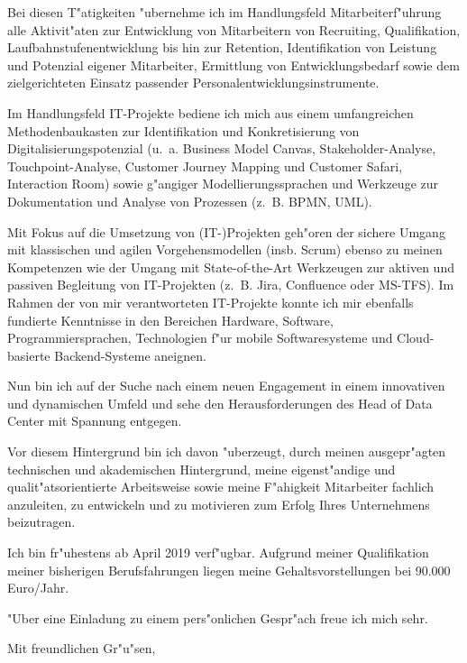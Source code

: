 \documentclass[11pt,a4paper]{dinbrief}
\begin{document}
\begin{letter}
Bei diesen T"atigkeiten "ubernehme ich im Handlungsfeld Mitarbeiterf"uhrung alle Aktivit"aten zur Entwicklung von Mitarbeitern von Recruiting, Qualifikation, Laufbahnstufenentwicklung bis hin zur Retention, Identifikation von Leistung und Potenzial eigener Mitarbeiter, Ermittlung von Entwicklungsbedarf sowie dem zielgerichteten Einsatz passender Personalentwicklungsinstrumente.

Im Handlungsfeld IT-Projekte bediene ich mich aus einem umfangreichen Methodenbaukasten zur Identifikation und Konkretisierung von Digitalisierungspotenzial (u.~a. Business Model Canvas, Stakeholder-Analyse, Touchpoint-Analyse, Customer Journey Mapping und Customer Safari, Interaction Room) sowie g"angiger Modellierungssprachen und Werkzeuge zur Dokumentation und Analyse von Prozessen (z.~B. BPMN, UML).

Mit Fokus auf die Umsetzung von (IT-)Projekten geh"oren der sichere Umgang mit klassischen und agilen Vorgehensmodellen (insb. Scrum) ebenso zu meinen Kompetenzen wie der Umgang mit State-of-the-Art Werkzeugen zur aktiven und passiven Begleitung von IT-Projekten (z.~B. Jira, Confluence oder MS-TFS). Im Rahmen der von mir verantworteten IT-Projekte konnte ich mir ebenfalls fundierte Kenntnisse in den Bereichen Hardware, Software, Programmiersprachen, Technologien f"ur mobile Softwaresysteme und Cloud-basierte Backend-Systeme aneignen.

Nun bin ich auf der Suche nach einem neuen Engagement in einem innovativen und dynamischen Umfeld und sehe den Herausforderungen des Head of Data Center mit Spannung entgegen.

Vor diesem Hintergrund bin ich davon "uberzeugt, durch meinen ausgepr"agten technischen und akademischen Hintergrund, meine eigenst"andige und qualit"atsorientierte Arbeitsweise sowie meine F"ahigkeit Mitarbeiter fachlich anzuleiten, zu entwickeln und zu motivieren zum Erfolg Ihres Unternehmens beizutragen.

Ich bin fr"uhestens ab April 2019 verf"ugbar. Aufgrund meiner Qualifikation meiner bisherigen Berufsfahrungen liegen meine Gehaltsvorstellungen bei 90.000 Euro/Jahr. 

"Uber eine Einladung zu einem pers"onlichen Gespr"ach freue ich mich sehr.

\closing{Mit freundlichen Gr"u"sen,}
\end{letter}
\end{document}
